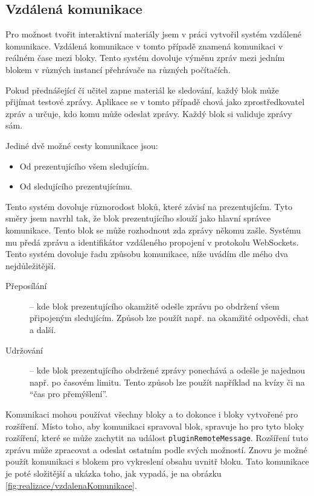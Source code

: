 \subsection{Vzdálená komunikace}\label{text:realizace/vzdalenaKomunikace}

Pro možnost tvořit interaktivní materiály jsem v práci vytvořil systém vzdálené komunikace.
Vzdálená komunikace v tomto případě znamená komunikaci v reálném čase mezi bloky.
Tento systém dovoluje výměnu zpráv mezi jedním blokem v různých instancí přehrávače na různých počítačích.

Pokud přednášející či učitel zapne materiál ke sledování, každý blok může přijímat testové zprávy.
Aplikace se v tomto případě chová jako zprostředkovatel zpráv a určuje, kdo komu může odeslat zprávy.
Každý blok si validuje zprávy sám.

Jediné dvě možné cesty komunikace jsou:

\begin{itemize}
    \item Od prezentujícího všem sledujícím.
    \item Od sledujícího prezentujícímu.
\end{itemize}

Tento systém dovoluje různorodost bloků, které závisí na prezentujícím.
Tyto směry jsem navrhl tak, že blok prezentujícího slouží jako hlavní správce komunikace.
Tento blok se může rozhodnout zda zprávy někomu zašle.
Systému mu předá zprávu a identifikátor vzdáleného propojení v protokolu WebSockets.
Tento systém dovoluje řadu způsobu komunikace, níže uvádím dle mého dva nejdůležitější.

\begin{description}
    \item[Přeposílání] -- kde blok prezentujícího okamžitě odešle zprávu po obdržení všem připojeným sledujícím. Způsob lze použít např. na okamžité odpovědi, chat a další.
    \item[Udržování] -- kde blok prezentujícího obdržené zprávy ponechává a odešle je najednou např. po časovém limitu. Tento způsob lze použít například na kvízy či na \enquote{čas pro přemýšlení}.
\end{description}

Komunikaci mohou používat všechny bloky a to dokonce i bloky vytvořené pro rozšíření.
Místo toho, aby komunikaci spravoval blok, spravuje ho pro tyto bloky rozšíření, které se může zachytit na událost \verb|pluginRemoteMessage|.
Rozšíření tuto zprávu může zpracovat a odeslat ostatním podle svých možností. 
Znovu je možné použít komunikaci s blokem pro vykreslení obsahu uvnitř bloku.
Tato komunikace je poté složitější a ukázka toho, jak vypadá, je na obrázku \ref{fig:realizace/vzdalenaKomunikace}.

